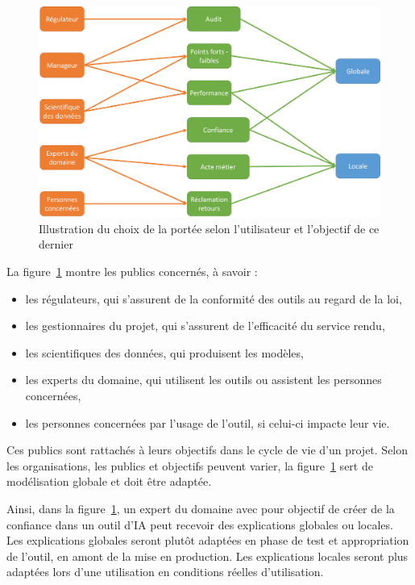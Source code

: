 \begin{figure}[htpb!]
    \centering
    \includegraphics[scale=0.22]{S5-Presentation_du_template_nlp/figures/guide_portee.png}
    \caption{Illustration du choix de la portée selon l'utilisateur et l'objectif de ce dernier}%
    \label{fig:guide_portee}
\end{figure}

La figure~\ref{fig:guide_portee} montre les publics concernés, à savoir :
\begin{itemize}
    \item les régulateurs, qui s'assurent de la conformité des outils au regard de la loi,
    \item les gestionnaires du projet, qui s'assurent de l'efficacité du service rendu,
    \item les scientifiques des données, qui produisent les modèles,
    \item les experts du domaine, qui utilisent les outils ou assistent les personnes concernées,
    \item les personnes concernées par l'usage de l'outil, si celui-ci impacte leur vie.
\end{itemize}
Ces publics sont rattachés à leurs objectifs dans le cycle de vie d'un projet. Selon les organisations, les publics et objectifs peuvent varier, la figure~\ref{fig:guide_portee} sert de modélisation globale et doit être adaptée.

Ainsi, dans la figure~\ref{fig:guide_portee}, un expert du domaine avec pour objectif de créer de la confiance dans un outil d'IA peut recevoir des explications globales ou locales. Les explications globales seront plutôt adaptées en phase de test et appropriation de l'outil, en amont de la mise en production. Les explications locales seront plus adaptées lors d'une utilisation en conditions réelles d'utilisation.

